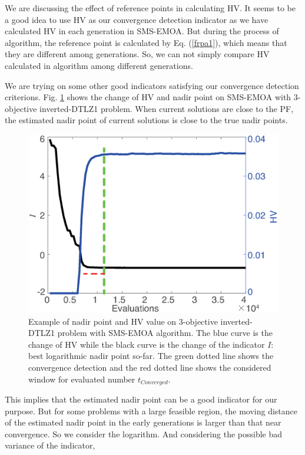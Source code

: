\documentclass[conference]{IEEEtran}
\begin{document}
We are discussing the effect of reference points in calculating HV. It seems to be a good
idea to use HV as our convergence detection indicator as we have calculated 
HV in each generation in SMS-EMOA. 
But during the process of algorithm, the reference point is calculated by Eq. (\ref{frpa1}), 
which means that they are different among generations. 
So, we can not simply compare HV calculated in algorithm among different generations. 

We are trying on some other good indicators satisfying our convergence detection criterions. 
Fig. \ref{wcd1} shows the change of HV and nadir point on SMS-EMOA  
with 3-objective inverted-DTLZ1 problem.
When current solutions are close to the PF, the estimated nadir point of current solutions is close 
to the true nadir points. 
\begin{figure}[!t]
  \centering
    \includegraphics[width=\columnwidth]{FVEMOA_IDTLZ1_M3_nadir_1}
  \caption{Example of nadir point and HV value on 3-objective inverted-DTLZ1 problem
  with SMS-EMOA algorithm.
  The blue curve is the change of HV 
  while the black curve is the change of the indicator $I$: best logarithmic nadir point so-far.
  The green dotted line shows the convergence detection 
  and the red dotted line shows the considered window for evaluated number $t_{Converged}$. 
  }
  \label{wcd1}
\end{figure}
This implies that the estimated nadir point can be a good indicator for our purpose. 
But for some problems with a large feasible region, 
the moving distance of the estimated nadir point in the early generations is larger than that near convergence.
So we consider the logarithm. And considering the possible bad variance of the indicator, 
\end{document}
